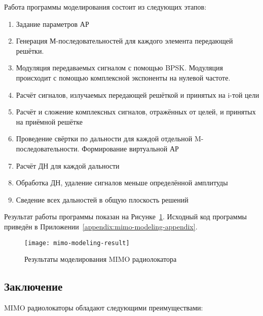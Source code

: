 Работа программы моделирования состоит из следующих этапов:

\begin{enumerate}
    \item Задание параметров АР
    \item Генерация М-последовательностей для каждого элемента передающей решётки. 
    \item Модуляция передаваемых сигналом с помощью BPSK. Модуляция происходит с помощью комплексной экспоненты на нулевой частоте.
    \item Расчёт сигналов, излучаемых передающей решёткой и принятых на i-той цели
    \item Расчёт и сложение комплексных сигналов, отражённых от целей, и принятых на приёмной решётке
    \item Проведение свёртки по дальности для каждой отдельной M-последовательности. Формирование виртуальной АР
    \item Расчёт ДН для каждой дальности
    \item Обработка ДН, удаление сигналов меньше определённой амплитуды
    \item Сведение всех дальностей в общую плоскость решений
\end{enumerate}

Результат работы программы показан на Рисунке~\ref{fig:mimo-modeling-result}. 
Исходный код программы приведён в Приложении~\ref{appendix:mimo-modeling-appendix}.


\begin{figure}[H]
    \centering
    \texttt{[image: mimo-modeling-result]}
    \caption{Результаты моделирования MIMO радиолокатора}%
    \label{fig:mimo-modeling-result}
\end{figure}

\subsection{Заключение}

MIMO радиолокаторы обладают следующими преимуществами:

